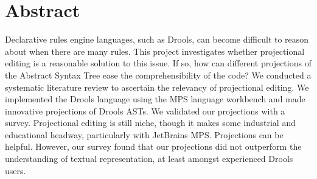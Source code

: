 \chapter*{Abstract}

Declarative rules engine languages, such as Drools, can become difficult to reason about when there are many rules.
This project investigates whether projectional editing is a reasonable solution to this issue.
If so, how can different projections of the Abstract Syntax Tree ease the comprehensibility of the code?
We conducted a systematic literature review to ascertain the relevancy of projectional editing.
We implemented the Drools language using the MPS language workbench and made innovative projections of Drools ASTs.
We validated our projections with a survey. 
Projectional editing is still niche, though it makes some industrial and educational headway, particularly with JetBrains MPS. 
Projections can be helpful. 
However, our survey found that our projections did not outperform the understanding of textual representation, at least amongst experienced Drools users. 

